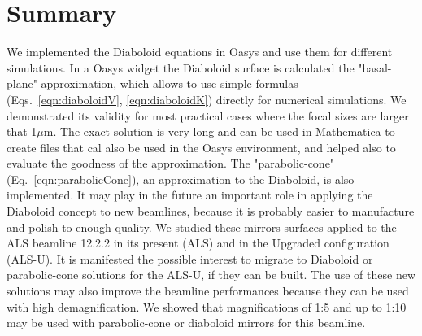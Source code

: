 \documentclass{iucr}              %
\begin{document}
\section{Summary}
\label{sec:summary}

We implemented the Diaboloid equations in Oasys and use them for different simulations. In a Oasys widget the Diaboloid surface is calculated the "basal-plane" approximation, which allows to use simple formulas (Eqs.~\ref{eqn:diaboloidV}, \ref{eqn:diaboloidK}) directly for numerical simulations. We demonstrated its validity for most practical cases where the focal sizes are larger that 1$\mu$m. 
The exact solution \cite{lacey} is very long and can be used in Mathematica to create files that cal also be used in the Oasys environment, and helped also to evaluate the goodness of the approximation. 
The "parabolic-cone" (Eq.~\ref{eqn:parabolicCone}), an  approximation to the Diaboloid, is also implemented. It may play in the future an important role in applying the Diaboloid concept to new beamlines, because it is probably easier to manufacture and polish to enough quality. We studied these mirrors surfaces applied to the ALS beamline 12.2.2 in its present (ALS) and in the Upgraded configuration (ALS-U). It is manifested the possible interest to migrate to Diaboloid or parabolic-cone solutions for the ALS-U, if they can be built. The use of these new solutions may also improve the beamline performances because they can be used with high demagnification. We showed that magnifications of 1:5 and up to 1:10 may be used with parabolic-cone or diaboloid mirrors for this beamline. 




\end{document}
